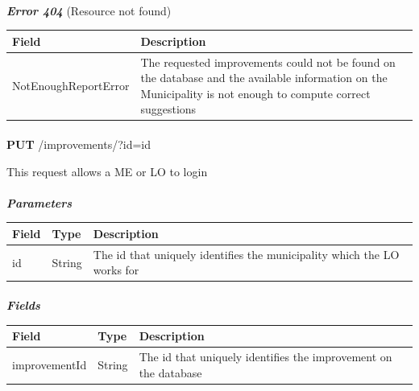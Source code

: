 						\paragraph{}
							\textit{\textbf{Error 404}} (Resource not found)
							\vspace{-2mm}
							\begin{table}[!h]
								\begin{tabular}{L{0.3\textwidth}L{0.5\textwidth}}
									\toprule
									\textbf{Field} & \textbf{Description} \\
									\midrule
								  	NotEnoughReportError & The requested improvements could not be found on the database and the available information on the Municipality is not enough to compute correct suggestions \\
								 	\bottomrule
								\end{tabular}
							\end{table}
						
						\paragraph{}
						\textbf{PUT} /improvements/?id={id}
						
						This request allows a ME or LO to login
						\paragraph{}
							\textit{\textbf{Parameters}}
							\vspace{-2mm}
							\begin{table}[!h]
								\begin{tabular}{L{0.2\textwidth}L{0.2\textwidth}L{0.4\textwidth}}
									\toprule
									\textbf{Field} & \textbf{Type} & \textbf{Description} \\
									\midrule
								 	id & String & The id that uniquely identifies the municipality which the LO works for \\
								 	\bottomrule
								\end{tabular}
							\end{table}
						\clearpage
						\paragraph{}
							\textit{\textbf{Fields}}
							\vspace{-2mm}
							\begin{table}[!h]
								\begin{tabular}{L{0.2\textwidth}L{0.15\textwidth}L{0.45\textwidth}}
									\toprule
									\textbf{Field} & \textbf{Type} & \textbf{Description} \\
									\midrule
								 	improvementId & String & The id that uniquely identifies the improvement on the database \\
								 	\bottomrule
								\end{tabular}
							\end{table}
